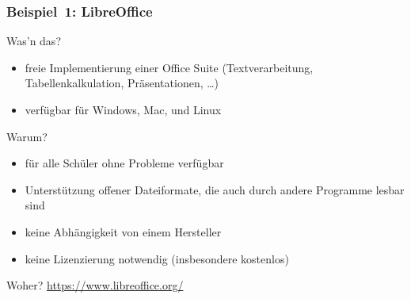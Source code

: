 \documentclass{beamer}
\begin{document}
\begin{frame}
  \frametitle{Beispiel~1: LibreOffice}

  \onslide<+->

  \begin{block}{Was'n das?}
    \begin{itemize}
    \item freie Implementierung einer Office Suite (Textverarbeitung,
      Tabellenkalkulation, Präsentationen, \dots)
    \item verfügbar für Windows, Mac, und Linux
    \end{itemize}
  \end{block}

  \onslide<+->

  \begin{block}{Warum?}
    \begin{itemize}
    \item für alle Schüler ohne Probleme verfügbar
    \item Unterstützung offener Dateiformate, die auch durch andere Programme
      lesbar sind
    \item keine Abhängigkeit von einem Hersteller
    \item keine Lizenzierung notwendig (insbesondere kostenlos)
    \end{itemize}
  \end{block}

  \onslide<+->

  \begin{block}{Woher?}
    \url{https://www.libreoffice.org/}
  \end{block}


\end{frame}
\end{document}
